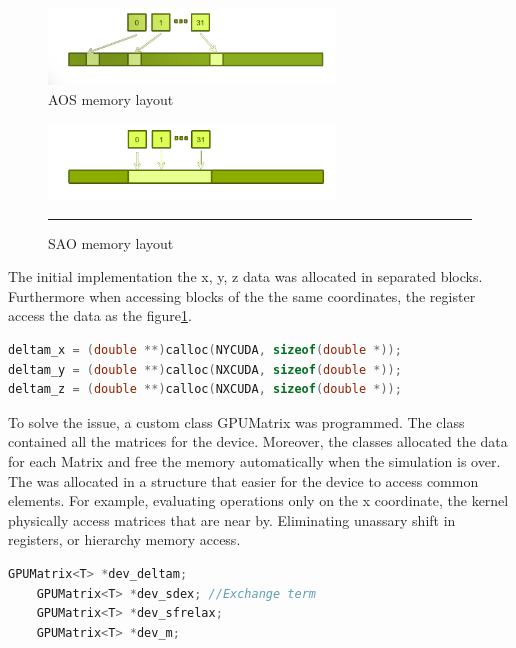 \begin{figure}[htbp]
	\centering
		\includegraphics[width=0.68\textwidth]{Figures/aos.png}
		\smallskip
	\caption[Array of structures (AOS)]{AOS memory layout }
	\label{fig:aos}
\end{figure}


\begin{figure}[htbp]
	\centering
		\includegraphics[width=0.68\textwidth]{Figures/soa.png}
		\rule{35em}{0.2pt}
	\caption[Structure of Arrays (SAO)]{SAO memory layout}
	\label{fig:sao}
\end{figure}

The initial implementation the  x, y, z data was allocated in separated blocks. Furthermore when accessing blocks of the the same coordinates, the register access the data as the figure\ref{fig:aos}.

\begin{lstlisting}[language=C++, caption={AOS implementation}]
deltam_x = (double **)calloc(NYCUDA, sizeof(double *));
deltam_y = (double **)calloc(NXCUDA, sizeof(double *));
deltam_z = (double **)calloc(NXCUDA, sizeof(double *));
\end{lstlisting}

To solve the issue, a custom class GPUMatrix was programmed. The class contained all the matrices for the device. Moreover, the classes allocated the data for each Matrix and free the memory automatically when the simulation is over. The was allocated in a structure that easier for the device to access common elements. For example, evaluating operations only on the x coordinate, the kernel physically access matrices that are near by. Eliminating unassary shift in registers, or hierarchy memory access.

\begin{lstlisting}[language=C++, caption={SOA implementation}]
    GPUMatrix<T> *dev_deltam;
    GPUMatrix<T> *dev_sdex; //Exchange term
    GPUMatrix<T> *dev_sfrelax;
    GPUMatrix<T> *dev_m; 
\end{lstlisting}

